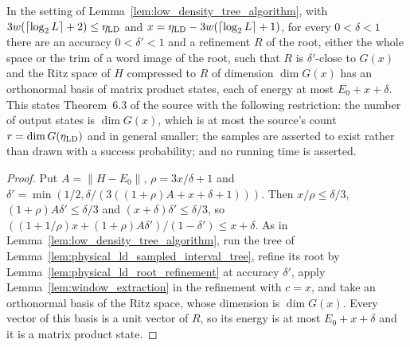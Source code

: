 \begin{lemma}
    \label{lem:low_density_tree_algorithm_output}
    \leanok
    In the setting of Lemma~\ref{lem:low_density_tree_algorithm}, with
    $3w(\lceil\log_2L\rceil+2)\le\eta_{\rm LD}$ and
    $x=\eta_{\rm LD}-3w(\lceil\log_2L\rceil+1)$, for every $0<\delta<1$ there
    are an accuracy $0<\delta'<1$ and a refinement $R$ of the root, either the
    whole space or the trim of a word image of the root, such that $R$ is
    $\delta'$-close to $G(x)$ and the Ritz space of $H$ compressed to $R$ of
    dimension $\dim G(x)$ has an orthonormal basis of matrix product states,
    each of energy at most $E_0+x+\delta$. This states Theorem~6.3 of the
    source with the following restriction: the number of output states is
    $\dim G(x)$, which is at most the source's count $r=\dim G(\eta_{\rm LD})$
    and in general smaller; the samples are asserted to exist rather than drawn with
    a success probability; and no running time is asserted.
\end{lemma}
\begin{proof}\leanok
    Put $A=\|H-E_0\|$, $\rho=3x/\delta+1$ and
    $\delta'=\min(1/2,\delta/(3((1+\rho)A+x+\delta+1)))$. Then
    $x/\rho\le\delta/3$, $(1+\rho)A\delta'\le\delta/3$ and
    $(x+\delta)\delta'\le\delta/3$, so
    $((1+1/\rho)x+(1+\rho)A\delta')/(1-\delta')\le x+\delta$. As in
    Lemma~\ref{lem:low_density_tree_algorithm}, run the tree of
    Lemma~\ref{lem:physical_ld_sampled_interval_tree}, refine its root by
    Lemma~\ref{lem:physical_ld_root_refinement} at accuracy $\delta'$, apply
    Lemma~\ref{lem:window_extraction} in the refinement with $c=x$, and take an
    orthonormal basis of the Ritz space, whose dimension is $\dim G(x)$.
    Every vector of this basis is a unit vector of $R$, so its energy is at
    most $E_0+x+\delta$ and it is a matrix product state.
\end{proof}


